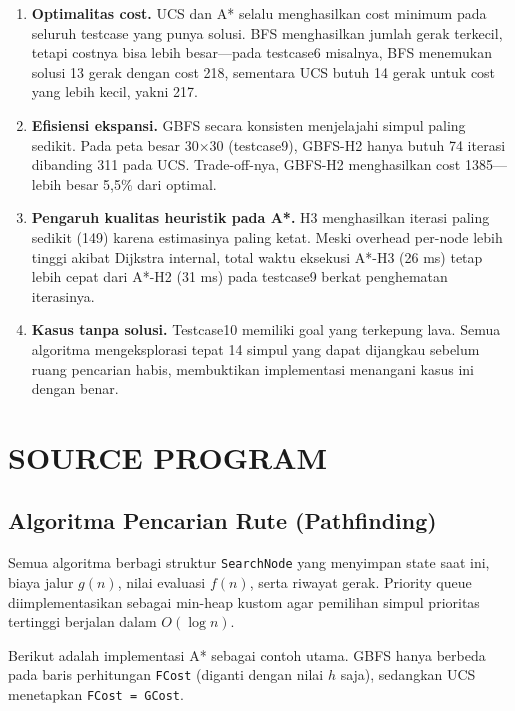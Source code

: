 \documentclass[11pt,a4paper]{article}
\begin{document}
\begin{enumerate}[noitemsep]
    \item \textbf{Optimalitas cost.} UCS dan A* selalu menghasilkan cost minimum pada seluruh testcase yang punya solusi. BFS menghasilkan jumlah gerak terkecil, tetapi costnya bisa lebih besar---pada testcase6 misalnya, BFS menemukan solusi 13 gerak dengan cost 218, sementara UCS butuh 14 gerak untuk cost yang lebih kecil, yakni 217.
    \item \textbf{Efisiensi ekspansi.} GBFS secara konsisten menjelajahi simpul paling sedikit. Pada peta besar 30$\times$30 (testcase9), GBFS-H2 hanya butuh 74 iterasi dibanding 311 pada UCS. Trade-off-nya, GBFS-H2 menghasilkan cost 1385---lebih besar 5,5\% dari optimal.
    \item \textbf{Pengaruh kualitas heuristik pada A*.} H3 menghasilkan iterasi paling sedikit (149) karena estimasinya paling ketat. Meski overhead per-node lebih tinggi akibat Dijkstra internal, total waktu eksekusi A*-H3 (26 ms) tetap lebih cepat dari A*-H2 (31 ms) pada testcase9 berkat penghematan iterasinya.
    \item \textbf{Kasus tanpa solusi.} Testcase10 memiliki goal yang terkepung lava. Semua algoritma mengeksplorasi tepat 14 simpul yang dapat dijangkau sebelum ruang pencarian habis, membuktikan implementasi menangani kasus ini dengan benar.
\end{enumerate}

\section{SOURCE PROGRAM}

\subsection{Algoritma Pencarian Rute (Pathfinding)}

Semua algoritma berbagi struktur \texttt{SearchNode} yang menyimpan state saat ini, biaya jalur $g(n)$, nilai evaluasi $f(n)$, serta riwayat gerak. Priority queue diimplementasikan sebagai min-heap kustom agar pemilihan simpul prioritas tertinggi berjalan dalam $O(\log n)$.

Berikut adalah implementasi A* sebagai contoh utama. GBFS hanya berbeda pada baris perhitungan \texttt{FCost} (diganti dengan nilai $h$ saja), sedangkan UCS menetapkan \texttt{FCost = GCost}.
\end{document}
